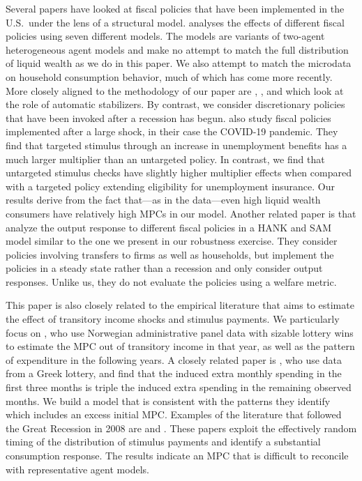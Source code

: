 \documentclass[\econtexRoot/HAFiscal]{subfiles}
\begin{document}
Several papers have looked at fiscal policies that have been implemented in the U.S.\ under the lens of a structural model. \cite{coenen2012effects} analyses the effects of different fiscal policies using seven different models. The models are variants of two-agent heterogeneous agent models and make no attempt to match the full distribution of liquid wealth as we do in this paper. We also attempt to match the microdata on household consumption behavior, much of which has come more recently.  More closely aligned to the methodology of our paper are \cite{mckay2016role}, \cite{mckay2021optimal}, and \cite{phan2024welfare} which look at the role of automatic stabilizers. By contrast, we consider discretionary policies that have been invoked after a recession has begun. \cite{bayercoronavirus} also study fiscal policies implemented after a large shock, in their case the COVID-19 pandemic. They find that targeted stimulus through an increase in unemployment benefits has a much larger multiplier than an untargeted policy. In contrast, we find that untargeted stimulus checks have slightly higher multiplier effects when compared with a targeted policy extending eligibility for unemployment insurance. Our results derive from the fact that---as in the data---even high liquid wealth consumers have relatively high MPCs in our model. Another related paper is \cite{broer2025stimulus} that analyze the output response to different fiscal policies in a HANK and SAM model similar to the one we present in our robustness exercise. They consider policies involving transfers to firms as well as households, but implement the policies in a steady state rather than a recession and only consider output responses. Unlike us, they do not evaluate the policies using a welfare metric. 

This paper is also closely related to the empirical literature that aims to estimate the effect of transitory income shocks and stimulus payments. We particularly focus on \cite{fagereng_mpc_2021}, who use Norwegian administrative panel data with sizable lottery wins to estimate the MPC out of transitory income in that year, as well as the pattern of expenditure in the following years. A closely related paper is \cite{kotsogiannisMPCs}, who use data from a Greek lottery, and find that the induced extra monthly spending in the first three months is triple the induced extra spending in the remaining observed months. We build a model that is consistent with the patterns they identify which includes an excess initial MPC. Examples of the literature that followed the Great Recession in 2008 are \cite{parker2013consumer} and \cite{broda2014economic}. These papers exploit the effectively random timing of the distribution of stimulus payments and identify a substantial consumption response. The results indicate an MPC that is difficult to reconcile with representative agent models.
\end{document}
